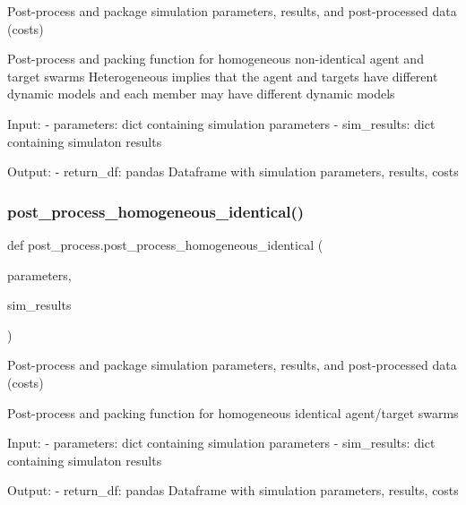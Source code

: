 \begin{DoxyVerb}Post-process and package simulation parameters, results, and post-processed data (costs)

Post-process and packing function for homogeneous non-identical agent and target swarms
Heterogeneous implies that the agent and targets have different dynamic models and each member may have different dynamic models

Input:
- parameters:           dict containing simulation parameters
- sim_results:          dict containing simulaton results

Output:
- return_df:            pandas Dataframe with simulation parameters, results, costs\end{DoxyVerb}
 \mbox{\label{namespacepost__process_aed2ed4226d6805a549be6b3e9c9ec72d}} 
\subsubsection{\texorpdfstring{post\_process\_homogeneous\_identical()}{post\_process\_homogeneous\_identical()}}
{\footnotesize\ttfamily def post\+\_\+process.\+post\+\_\+process\+\_\+homogeneous\+\_\+identical (\begin{DoxyParamCaption}\item[{}]{parameters,  }\item[{}]{sim\+\_\+results }\end{DoxyParamCaption})}

\begin{DoxyVerb}Post-process and package simulation parameters, results, and post-processed data (costs)

Post-process and packing function for homogeneous identical agent/target swarms

Input:
- parameters:           dict containing simulation parameters
- sim_results:          dict containing simulaton results

Output:
- return_df:            pandas Dataframe with simulation parameters, results, costs\end{DoxyVerb}
 \mbox{\label{namespacepost__process_a11b9639a84b126d743bb26abe37ad8bc}} 
